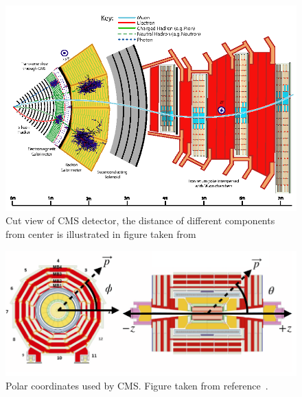 \begin{figure}[H]
\centering
\includegraphics[scale=0.5]{chapter2/CMS_cutview.png}
\caption{Cut view of CMS detector, the distance of different components from center is illustrated in figure taken from~\cite{Davis:2204863}}
\label{CMS_sideview}
\end{figure}

\begin{figure}[H]
\centering
\includegraphics[scale=0.48]{chapter2/cms-coordinate.png}
\caption{Polar coordinates used by CMS. Figure taken from reference~\cite{Collaboration_2010}.}
\label{cms-polar}
\end{figure}


